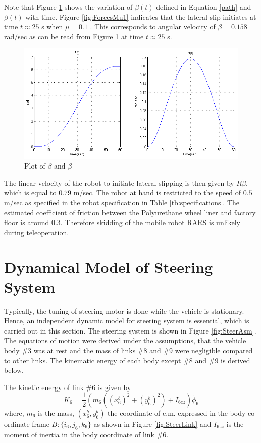 Note that Figure \ref{fig:beta1} shows the variation of $\beta(t)$ defined in Equation \ref{path} and $\dot\beta(t)$ with time.  Figure \ref{fig:ForcesMu1} indicates  that the lateral slip initiates at time $t\approx25$ s when $\mu=0.1$ . This corresponds to angular velocity of $ \dot \beta =0.158$ rad/sec as can be read from Figure \ref{fig:beta1} at time $t\approx25$ s.
\begin{figure}[h]
	\centering
	\includegraphics[width=\linewidth]{Chapter4/fig/beta}
	\caption{Plot of $\beta$ and $\dot{\beta}$}
	\label{fig:beta1}
\end{figure}
The linear velocity of the robot to initiate lateral slipping is then given by $R\dot{\beta}$, which is equal to $0.79$  m/sec. The robot at hand is restricted to the speed of $0.5$ m/sec as specified in the robot specification in Table \ref{tb:specifications}. The estimated coefficient of friction between the Polyurethane wheel liner and factory floor is around $0.3$. Therefore skidding of the mobile robot RARS is unlikely during teleoperation. 



\section{Dynamical Model of Steering System}
Typically, the tuning of steering motor is done while the vehicle is stationary. Hence, an independent dynamic model for steering system is essential, which is carried out in this section. 
The  steering system is shown in Figure \ref{fig:SteerAsm}. The equations of motion were derived under the assumptions,  that the vehicle body \#3 was at rest and  the mass of links \#8 and \#9 were negligible compared to other links. The kinematic energy of each body except \#8 and \#9 is derived below.

The kinetic energy of link  \#6 is given by
\begin{equation}
 K_6=\frac{1}{2}(m_6((x^b_6)^2+(y^b_6)^2)+I_{6zz})\dot{\phi_6}
\end{equation}
 where, $m_6$ is the mass, $(x^b_6,y^b_6)$  the coordinate of c.m.  expressed  in the body co-ordinate frame $B:\{i_6,j_6,k_6\}$ as shown in Figure \ref{fig:SteerLink} and $I_{6zz}$ is the moment of inertia in the body coordinate of link \#6.
 
